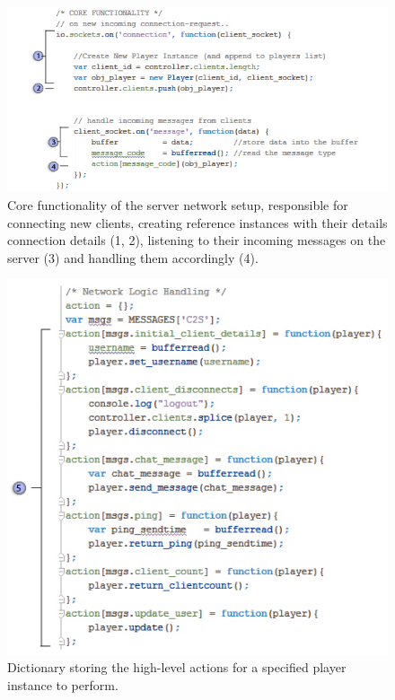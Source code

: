 \documentclass[bsc, 12pt, twoside, singlespacing, parskip, abbrevs, notimes, normalheadings, logo, deptreport]{styles/infthesis}
\begin{document}
\begin{figure}[H]
	\includegraphics[scale=0.72]{images/server_code.jpg}
	\caption{Core functionality of the server network setup, responsible for connecting new clients, creating reference instances with their details connection details (1, 2), listening to their incoming messages on the server (3) and handling them accordingly (4). }
	\label{fig:server_core}
\end{figure}
\vspace{2em}
\begin{figure}[H]
	\includegraphics[scale=0.65]{images/server_actions.jpg}
	\caption{Dictionary storing the high-level actions for a specified player instance to perform.}
	\label{fig:server_actions}
\end{figure}
\end{document}

